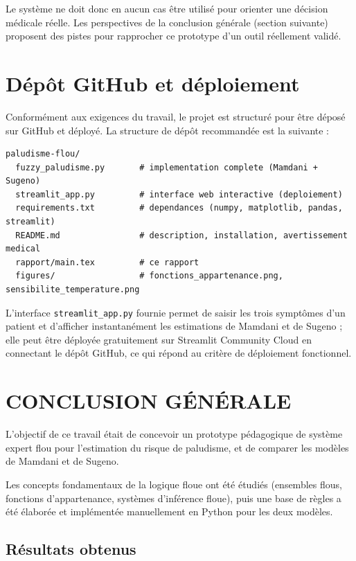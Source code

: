 \documentclass[a4paper,12pt]{report} %
\begin{document}
Le système ne doit donc en aucun cas être utilisé pour orienter une décision médicale réelle. Les perspectives de la conclusion générale (section suivante) proposent des pistes pour rapprocher ce prototype d'un outil réellement validé.

\section{Dépôt GitHub et déploiement}
\label{sec:github}

Conformément aux exigences du travail, le projet est structuré pour être déposé sur GitHub et déployé. La structure de dépôt recommandée est la suivante :

\begin{verbatim}
paludisme-flou/
  fuzzy_paludisme.py       # implementation complete (Mamdani + Sugeno)
  streamlit_app.py         # interface web interactive (deploiement)
  requirements.txt         # dependances (numpy, matplotlib, pandas, streamlit)
  README.md                # description, installation, avertissement medical
  rapport/main.tex         # ce rapport
  figures/                 # fonctions_appartenance.png, sensibilite_temperature.png
\end{verbatim}

L'interface \texttt{streamlit\_app.py} fournie permet de saisir les trois symptômes d'un patient et d'afficher instantanément les estimations de Mamdani et de Sugeno ; elle peut être déployée gratuitement sur Streamlit Community Cloud en connectant le dépôt GitHub, ce qui répond au critère de déploiement fonctionnel.


\newpage
\section*{CONCLUSION GÉNÉRALE}

L'objectif de ce travail était de concevoir un prototype pédagogique de système expert flou pour l'estimation du risque de paludisme, et de comparer les modèles de Mamdani et de Sugeno.

Les concepts fondamentaux de la logique floue ont été étudiés (ensembles flous, fonctions d'appartenance, systèmes d'inférence floue), puis une base de règles a été élaborée et implémentée manuellement en Python pour les deux modèles.

\subsection*{Résultats obtenus}
\end{document}
